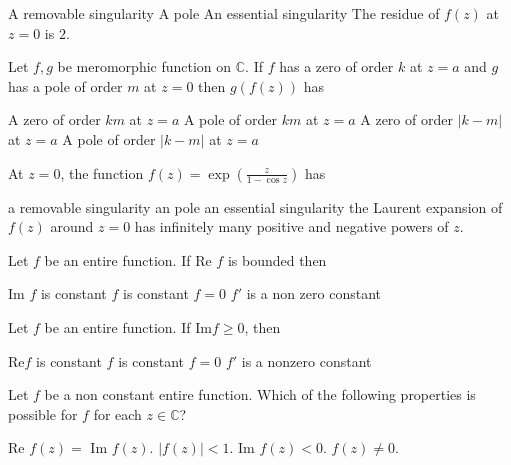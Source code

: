 \documentclass[10pt]{exam}
\newcommand{\C}{\ensuremath{\mathbb{C}}}
\newcommand{\smallb}[1]{\ensuremath{\left ( {#1} \right )}}
\begin{document}
\begin{questions}
\begin{checkboxes}
\choice A removable singularity 
\choice A pole 
\choice An essential singularity
\choice The residue of $f(z)$ at $z = 0$ is $2$. 
\end{checkboxes}


\question 
Let $f,g$ be meromorphic function on $\C$. If $f$ has a zero of order $k$ at $z = a$ and $g$ has a pole of order $m$ at $z = 0$ then $g(f(z))$ has 

\begin{choices}
\choice A zero of order $km$ at $z = a$ 
\choice A pole of order $km$ at $z = a$ 
\choice A zero of order $ |k - m| $ at $z = a$ 
\choice A pole of order $ |k - m| $ at $z = a$ 
\end{choices}

\question 
At $z = 0$, the function $f(z) = \exp \smallb{\frac{z}{1 - \cos z}}$ has 

\begin{checkboxes}
\choice a removable singularity
\choice an pole 
\choice an essential singularity 
\choice the Laurent expansion of $f(z)$ around $z = 0$ has infinitely many positive and negative powers of $z$.
\end{checkboxes}

\question 
Let $f$ be an entire function. If Re $f$ is bounded then 

\begin{oneparcheckboxes}
\choice Im $f$ is constant 
\choice $f$ is constant 
\choice $f = 0$ 
\choice $f'$ is a non zero constant 
\end{oneparcheckboxes}

\question 
Let $f$ be an entire function. If Im$f \geq 0$, then 

\begin{oneparcheckboxes}
\choice Re$f$ is constant 
\choice $f$ is constant 
\choice $f = 0$ 
\choice $f'$ is a nonzero constant 
\end{oneparcheckboxes}

\question 
Let $f$ be a non constant entire function. Which of the following properties is possible for $f$ for each $z \in \C$?

\begin{oneparchoices}
\choice Re $f(z) =$ Im $f(z)$.
\choice $|f(z)| < 1 $.  
\choice Im $f(z) < 0$.
\choice $f(z) \neq 0$.
\end{oneparchoices}



\end{questions}
\end{document}
